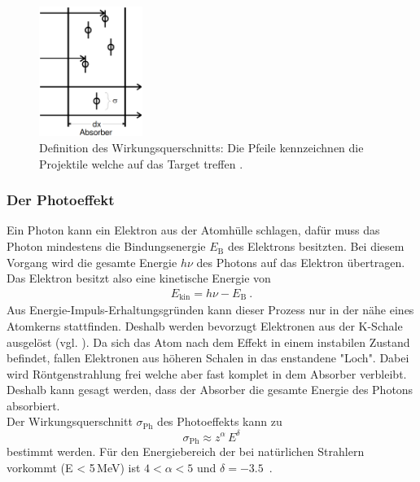 \begin{figure}
	\centering
	\includegraphics[width=0.3\textwidth]{Bilder/WkeitWW.png}
	\caption{Definition des Wirkungsquerschnitts: Die Pfeile kennzeichnen die Projektile welche auf das Target treffen \cite{V18}.}
	\label{fig:WkeitWW}
\end{figure}



\subsubsection{Der Photoeffekt}
Ein Photon kann ein Elektron aus der Atomhülle schlagen, dafür muss das Photon mindestens die Bindungsenergie $E_\text{B}$ des Elektrons besitzten. Bei diesem Vorgang wird die gesamte Energie $h\nu$ des Photons auf das Elektron übertragen. Das Elektron besitzt also eine kinetische Energie von
\begin{align}
	E_\text{kin} = h\nu - E_\text{B} \ .
\end{align}
Aus Energie-Impuls-Erhaltungsgründen kann dieser Prozess nur in der nähe eines Atomkerns stattfinden. Deshalb werden bevorzugt Elektronen aus der K-Schale ausgelöst (vgl. \cite[3]{V18}). Da sich das Atom nach dem Effekt in einem instabilen Zustand befindet, fallen Elektronen aus höheren Schalen in das enstandene "Loch". Dabei wird Röntgenstrahlung frei welche aber fast komplet in dem Absorber verbleibt. Deshalb kann gesagt werden, dass der Absorber die gesamte Energie des Photons absorbiert. \\
Der Wirkungsquerschnitt $\sigma_\text{Ph}$ des Photoeffekts kann zu
\begin{equation}
	\sigma_\text{Ph} \approx z^{\alpha}\,E^{\delta}
\end{equation}
bestimmt werden. Für den Energiebereich der bei natürlichen Strahlern vorkommt (E < 5\,MeV) ist $4 < \alpha < 5$ und $\delta = -3.5$\ .




